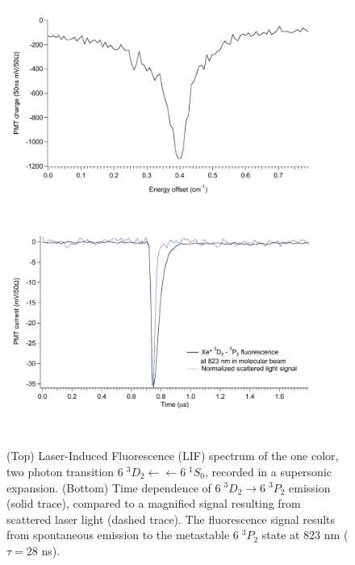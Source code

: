 \documentclass[12pt]{mitthesis}
\begin{document}
\begin{figure}
  \caption{(Top) Laser-Induced Fluorescence (LIF) spectrum of the one
    color, two photon transition  $6\;^3D_2 \leftarrow
    \leftarrow 6\;^1S_0$, recorded in a supersonic expansion.
    (Bottom) Time dependence of  $6\;^3D_2 \rightarrow
    6\;^3P_2$ emission (solid trace), compared to a magnified signal
    resulting from scattered laser light (dashed trace). The
    fluorescence signal results from spontaneous emission to the
    metastable $6\;^3P_2$ state at 823 nm ($\tau = 28$ ns).
    }
  \label{fig:xe-beam}
  \centering
  \includegraphics[width=6in]{Xe-beamlif-060406.pdf}
  \includegraphics[width=6in]{Xe-beamtrc-060406.pdf}
\end{figure}
\end{document}
